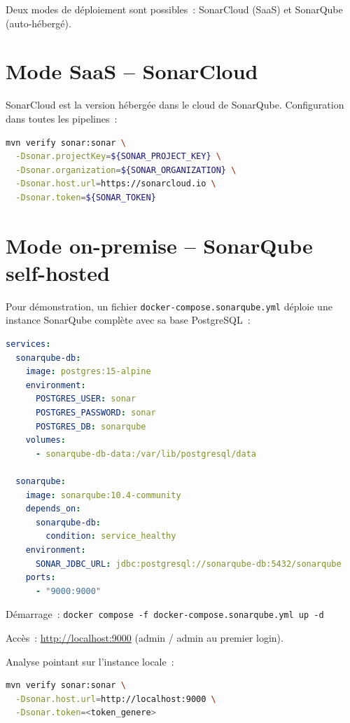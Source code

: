 \documentclass[12pt,a4paper]{report}
\begin{document}
Deux modes de déploiement sont possibles~: SonarCloud (SaaS) et SonarQube
(auto-hébergé).

\section{Mode SaaS -- SonarCloud}

SonarCloud est la version hébergée dans le cloud de SonarQube. Configuration
dans toutes les pipelines~:

\begin{lstlisting}[language=bash, caption={Lancement de SonarCloud}]
mvn verify sonar:sonar \
  -Dsonar.projectKey=${SONAR_PROJECT_KEY} \
  -Dsonar.organization=${SONAR_ORGANIZATION} \
  -Dsonar.host.url=https://sonarcloud.io \
  -Dsonar.token=${SONAR_TOKEN}
\end{lstlisting}

\section{Mode on-premise -- SonarQube self-hosted}

Pour démonstration, un fichier \texttt{docker-compose.sonarqube.yml} déploie
une instance SonarQube complète avec sa base PostgreSQL~:

\begin{lstlisting}[language=YAML, caption={docker-compose.sonarqube.yml -- extrait}]
services:
  sonarqube-db:
    image: postgres:15-alpine
    environment:
      POSTGRES_USER: sonar
      POSTGRES_PASSWORD: sonar
      POSTGRES_DB: sonarqube
    volumes:
      - sonarqube-db-data:/var/lib/postgresql/data

  sonarqube:
    image: sonarqube:10.4-community
    depends_on:
      sonarqube-db:
        condition: service_healthy
    environment:
      SONAR_JDBC_URL: jdbc:postgresql://sonarqube-db:5432/sonarqube
    ports:
      - "9000:9000"
\end{lstlisting}

Démarrage~: \texttt{docker compose -f docker-compose.sonarqube.yml up -d}

Accès~: \url{http://localhost:9000} (admin / admin au premier login).

Analyse pointant sur l'instance locale~:

\begin{lstlisting}[language=bash]
mvn verify sonar:sonar \
  -Dsonar.host.url=http://localhost:9000 \
  -Dsonar.token=<token_genere>
\end{lstlisting}
\end{document}
